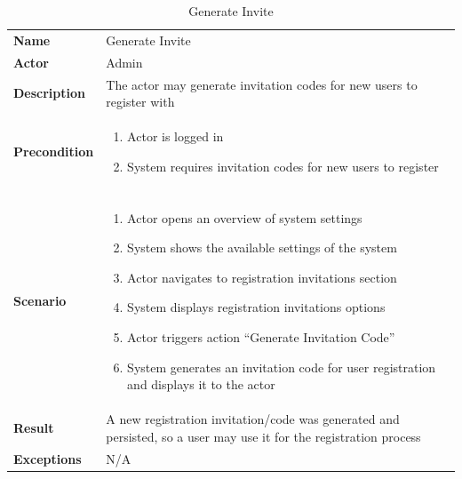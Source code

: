 \begin{table}[ht]
    \caption{Generate Invite}
    \begin{tabular}{|L{5cm}|L{10cm}|}
        \toprule
        \textbf{Name}        & Generate Invite                                                        \\
        \textbf{Actor}       & Admin                                                                  \\
        \textbf{Description} & The actor may generate invitation codes for new users to register with \\
        \textbf{Precondition} &
        \vspace{-0.75cm}
        \begin{enumerate}
            \setlength\itemsep{-0.5em}
            \item Actor is logged in
            \item System requires invitation codes for new users to register
        \end{enumerate} \\[-0.5cm] \\
        \textbf{Scenario} &
        \vspace{-0.75cm}
        \begin{enumerate}
            \setlength\itemsep{-0.5em}
            \item Actor opens an overview of system settings
            \item System shows the available settings of the system
            \item Actor navigates to registration invitations section
            \item System displays registration invitations options
            \item Actor triggers action \enquote{Generate Invitation Code}
            \item System generates an invitation code for user registration and displays it to the actor
        \end{enumerate} \\[-0.5cm]
        \textbf{Result}  & A new registration invitation/code was generated and persisted, so a user may use
        it for the registration process                                                                    \\
        \textbf{Exceptions}  & N/A                                                                    \\
        \bottomrule
    \end{tabular}
    \label{tab:table30}
\end{table}

